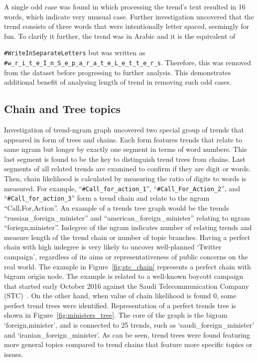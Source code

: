 \documentclass[utf8]{frontiersSCNS} %
\begin{document}
A single odd case was found in which processing the trend’s text resulted in 16 words, which indicate very unusual case. Further investigation uncovered that the trend consists of three words that were intentionally letter spaced, seemingly for fun. To clarify it further, the trend was in Arabic and it is the equivalent of {\texttt{\#WriteInSeparateLetters} but was written as {\footnotesize{{\texttt{\#w\_r\_i\_t\_e\_I\_n\_S\_e\_p\_a\_r\_a\_t\_e\_L\_e\_t\_t\_e\_r\_s}}}}. Therefore, this was removed from the dataset before progressing to further analysis. This demonstrates additional benefit of analysing length of trend in removing such odd cases.

\subsection{Chain and Tree topics}

Investigation of trend-ngram graph uncovered two special group of trends that appeared in form of trees and chains.  Each form features trends that relate to same ngram but longer by exactly one segment in terms of word numbers. This last segment is found to be the key to distinguish trend trees from chains. Last segments of all related trends are examined to confirm if they are digit or words. Then, chain likelihood is calculated by measuring the ratio of digits to words is measured.  For example, “{\texttt{\#Call\_for\_action\_1}}”, “{\texttt{\#Call\_For\_Action\_2}}”, and “{\texttt{\#Call\_for\_action\_3}}” form a trend chain and relate to the ngram “Call,For,Action”. An example of a trends tree graph would be the trends “russian\_foreign\_minister” and “american\_foreign\_minister” relating to ngram “foriegn,minister”. Indegree of the ngram indicates number of relating trends and measure length of the trend chain or number of topic branches. Having a perfect chain with high indegree is very likely to uncover well-planned ‘Twitter campaign’, regardless of its aims or representativeness of public concerns on the real world.  The example in Figure~\ref{fig:stc_chain} represents a perfect chain with bigram origin node. The example is related to a well-known boycott campaign that started early October 2016 against the Saudi Telecommunication Company (STC)~\cite{naffee-2016}.  On the other hand, when value of chain likelihood is found 0, some perfect trend trees were identified. Representation of a perfect trends tree is shown in Figure~\ref{fig:ministers_tree}.  The core of the graph is the bigram ‘foreign,minister’, and is connected to 25 trends, such as ‘saudi\_foreign\_minister’ and ‘iranian\_foreign\_minister’. As can be seen, trend trees were found featuring more general topics compared to trend chains that feature more specific topics or issues.

}
\end{document}

